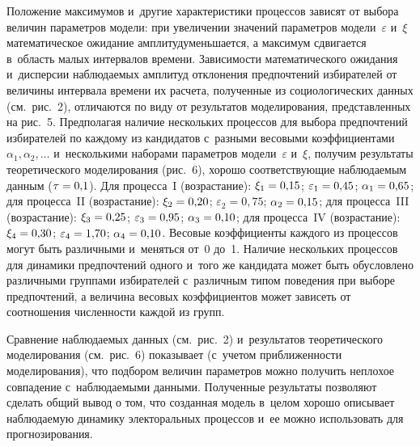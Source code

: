 \begin{multicols}{2}
 Положение 
максимумов и~другие характеристики процессов зависят от выбора величин 
па\-ра\-мет\-ров модели: при увеличении значений параметров модели~$\varepsilon$ 
и~$\xi$ математическое ожидание амплитуд\linebreak уменьшается, а максимум 
сдвигается в~об\-ласть малых интервалов времени. Зависимости 
математического ожидания и~дисперсии наблюдаемых амплитуд отклонения 
предпочтений избирателей от \mbox{величины} интервала времени их расчета, 
полученные из социологических данных (см.\ рис.~2), отличаются по виду от 
результатов моделирования, представленных на рис.~5. Предполагая наличие 
нескольких процессов для выбора предпочтений избирателей по каждому из 
кандидатов с~разными весовыми коэффициентами $\alpha_1, \alpha_2,\ldots$ 
и~несколькими наборами параметров модели~$\varepsilon$ и~$\xi$, получим 
результаты теоретического моделирования (рис.~6), хорошо соответствующие 
наблюдаемым данным ($\tau\hm=0{,}1$). Для процесса~I (возрастание): $\xi_1\hm=0{,}15$; 
$\varepsilon_1\hm=0{,}45$; $\alpha_1\hm=0{,}65$; для процесса~II 
(возрастание): $\xi_2\hm=0{,}20$; $\varepsilon_2 = 0{,}75$;  
$\alpha_2\hm=0{,}15$; для процесса~III (возрастание): $\xi_3\hm= 0{,}25$; 
$\varepsilon_3\hm=0{,}95$; $\alpha_3\hm=0{,}10$; для 
процесса~IV (возрастание): $\xi_4\hm=0{,}30$; $\varepsilon_4\hm=1{,}70$; 
 $\alpha_4\hm=0{,}10$. Весовые коэффициенты каждого из 
процессов могут быть различными и~меняться от~0 до~1. Наличие нескольких 
процессов для динамики предпочтений одного и~того же кандидата может быть 
обусловлено различными группами избирателей с~различным типом поведения 
при выборе предпочтений, а величина весовых коэффициентов может зависеть 
от соотношения численности каждой из групп. 
    
    Сравнение наблюдаемых данных (см.\ рис.~2) и~результатов теоретического 
моделирования (см.\ рис.~6) показывает (с~учетом приближенности 
моделирования), что подбором величин параметров можно получить неплохое 
совпадение с~наблюдаемыми данными. Полученные результаты позволяют 
сделать общий вывод о том, что созданная модель в~целом хорошо описывает 
наблюдаемую динамику электоральных процессов и~ее можно использовать для 
прогнозирования. 
    

\end{multicols}

